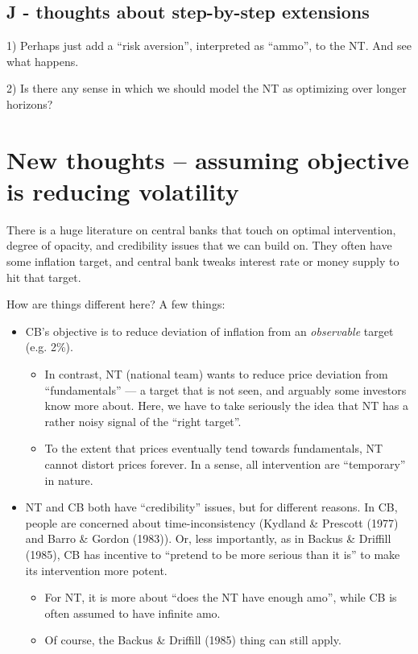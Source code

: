 \documentclass[12pt]{article}
\begin{document}
\subsection{J - thoughts about step-by-step extensions}

1) Perhaps just add a ``risk aversion'', interpreted as ``ammo'', to the NT. And see what happens. 

2) Is there any sense in which we should model the NT as optimizing over longer horizons? 



\newpage
\section{New thoughts -- assuming objective is reducing volatility}

There is a huge literature on central banks that touch on optimal intervention, degree of opacity, and credibility issues that we can build on. They often have some inflation target, and central bank tweaks interest rate or money supply to hit that target. 

How are things different here? A few things:
\begin{itemize}
    \item CB's objective is to reduce deviation of inflation from an \textit{observable} target (e.g. 2\%). 
    \begin{itemize}
        \item In contrast, NT (national team) wants to reduce price deviation from ``fundamentals'' --- a target that is not seen, and arguably some investors know more about. Here, we have to take seriously the idea that NT has a rather noisy signal of the ``right target''. 
        \item To the extent that prices eventually tend towards fundamentals, NT cannot distort prices forever. In a sense, all intervention are ``temporary'' in nature. 
    \end{itemize}

    \item NT and CB both have ``credibility'' issues, but for different reasons. In CB, people are concerned about time-inconsistency (Kydland \& Prescott (1977) and Barro \& Gordon (1983)). Or, less importantly, as in Backus \& Driffill (1985), CB has incentive to ``pretend to be more serious than it is'' to make its intervention more potent. 
    \begin{itemize}
        \item For NT, it is more about ``does the NT have enough amo'', while CB is often assumed to have infinite amo. 
        \item Of course, the Backus \& Driffill (1985) thing can still apply. 
    \end{itemize}
\end{itemize}
\end{document}
